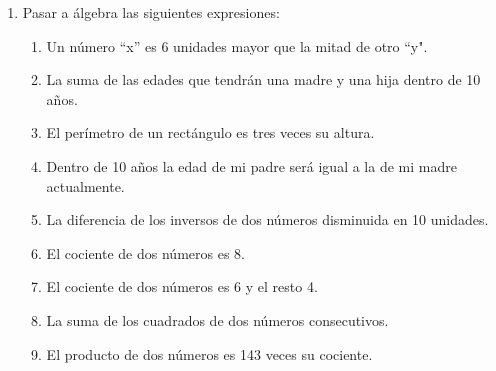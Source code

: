 \documentclass[a4paper,12pt]{article}
\begin{document}
\begin{enumerate}
\begin{multicols}{2}
\begin{enumerate}[label=\textbf{\alph*)}]
    \item $\dfrac{2x - 2}{2x - 6}$
    
    \vspace{0.4cm}
    
    \item $\dfrac{x^2 - 1}{x^2 - 4x + 3}$
    
    \vspace{0.4cm}
    
    \item $\dfrac{x - 1}{x^2 - 1}$
    
    \columnbreak
    
    \item $\dfrac{2x^3 + 4x^2 + 2x}{6x^3 - 6x}$
    
    \vspace{0.4cm}
    
    \item $\dfrac{x^3 + 3x^2 - 4}{x^2 - 5x + 4}$
    
    \vspace{0.4cm}
    
    \item $\dfrac{x^2 - 1}{x^2 - 2x + 1}$
\end{enumerate}
\end{multicols}

\item  Pasar a álgebra las siguientes expresiones:
    \begin{enumerate}
        \item Un número “x” es 6 unidades mayor que la mitad de otro “y".
        \item La suma de las edades que tendrán una madre y una hija dentro de 10 años.
        \item El perímetro de un rectángulo es tres veces su altura.
        \item Dentro de 10 años la edad de mi padre será igual a la de mi madre actualmente.
        \item La diferencia de los inversos de dos números disminuida en 10 unidades.
        \item El cociente de dos números es 8.
        \item El cociente de dos números es 6 y el resto 4.
        \item La suma de los cuadrados de dos números consecutivos.
        \item El producto de dos números es 143 veces su cociente.
    \end{enumerate}



\end{enumerate}
\end{document}

